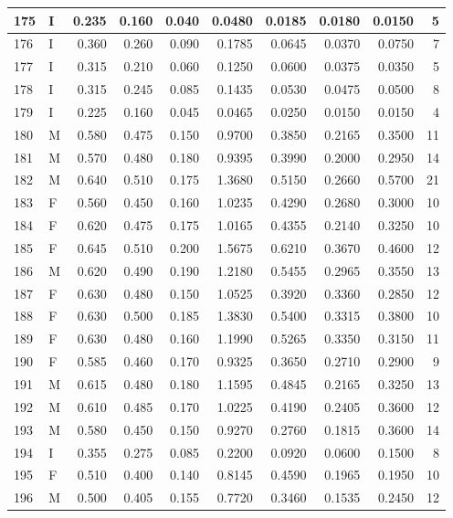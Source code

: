\documentclass[9pt,twocolumn,twoside,]{pnas-new}
\begin{document}
\begin{tabular}{l|l|r|r|r|r|r|r|r|r}
\hline
175 & I & 0.235 & 0.160 & 0.040 & 0.0480 & 0.0185 & 0.0180 & 0.0150 & 5\\
\hline
176 & I & 0.360 & 0.260 & 0.090 & 0.1785 & 0.0645 & 0.0370 & 0.0750 & 7\\
\hline
177 & I & 0.315 & 0.210 & 0.060 & 0.1250 & 0.0600 & 0.0375 & 0.0350 & 5\\
\hline
178 & I & 0.315 & 0.245 & 0.085 & 0.1435 & 0.0530 & 0.0475 & 0.0500 & 8\\
\hline
179 & I & 0.225 & 0.160 & 0.045 & 0.0465 & 0.0250 & 0.0150 & 0.0150 & 4\\
\hline
180 & M & 0.580 & 0.475 & 0.150 & 0.9700 & 0.3850 & 0.2165 & 0.3500 & 11\\
\hline
181 & M & 0.570 & 0.480 & 0.180 & 0.9395 & 0.3990 & 0.2000 & 0.2950 & 14\\
\hline
182 & M & 0.640 & 0.510 & 0.175 & 1.3680 & 0.5150 & 0.2660 & 0.5700 & 21\\
\hline
183 & F & 0.560 & 0.450 & 0.160 & 1.0235 & 0.4290 & 0.2680 & 0.3000 & 10\\
\hline
184 & F & 0.620 & 0.475 & 0.175 & 1.0165 & 0.4355 & 0.2140 & 0.3250 & 10\\
\hline
185 & F & 0.645 & 0.510 & 0.200 & 1.5675 & 0.6210 & 0.3670 & 0.4600 & 12\\
\hline
186 & M & 0.620 & 0.490 & 0.190 & 1.2180 & 0.5455 & 0.2965 & 0.3550 & 13\\
\hline
187 & F & 0.630 & 0.480 & 0.150 & 1.0525 & 0.3920 & 0.3360 & 0.2850 & 12\\
\hline
188 & F & 0.630 & 0.500 & 0.185 & 1.3830 & 0.5400 & 0.3315 & 0.3800 & 10\\
\hline
189 & F & 0.630 & 0.480 & 0.160 & 1.1990 & 0.5265 & 0.3350 & 0.3150 & 11\\
\hline
190 & F & 0.585 & 0.460 & 0.170 & 0.9325 & 0.3650 & 0.2710 & 0.2900 & 9\\
\hline
191 & M & 0.615 & 0.480 & 0.180 & 1.1595 & 0.4845 & 0.2165 & 0.3250 & 13\\
\hline
192 & M & 0.610 & 0.485 & 0.170 & 1.0225 & 0.4190 & 0.2405 & 0.3600 & 12\\
\hline
193 & M & 0.580 & 0.450 & 0.150 & 0.9270 & 0.2760 & 0.1815 & 0.3600 & 14\\
\hline
194 & I & 0.355 & 0.275 & 0.085 & 0.2200 & 0.0920 & 0.0600 & 0.1500 & 8\\
\hline
195 & F & 0.510 & 0.400 & 0.140 & 0.8145 & 0.4590 & 0.1965 & 0.1950 & 10\\
\hline
196 & M & 0.500 & 0.405 & 0.155 & 0.7720 & 0.3460 & 0.1535 & 0.2450 & 12\\

\end{tabular}
\end{document}
